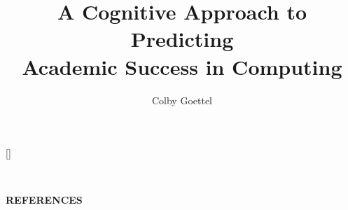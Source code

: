 \documentclass[letterpaper,12pt,oneside]{report}%
\begin{document}
\title{A Cognitive Approach to Predicting\\Academic Success in Computing}
\author{Colby Goettel}
\showBYUHeader







\nocite{*}
[\refname]{}
{%
  ~
  \vspace{0.5in}
  \begin{center}
    \textbf{REFERENCES}
  \end{center}
  \printbibliography
}

\appendix

\end{document}
